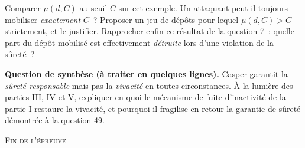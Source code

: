 \documentclass[11pt,a4paper]{article}
\begin{document}
\Q Comparer $\mu(d,C)$ au seuil $C$ sur cet exemple. Un attaquant peut-il toujours
mobiliser \emph{exactement} $C$~? Proposer un jeu de dépôts pour lequel $\mu(d,C)>C$
strictement, et le justifier. Rapprocher enfin ce résultat de la question 7~: quelle part du
dépôt mobilisé est effectivement \emph{détruite} lors d'une violation de la sûreté~?

\Q \textbf{Question de synthèse (à traiter en quelques lignes).} Casper garantit la
\emph{sûreté responsable} mais pas la \emph{vivacité} en toutes circonstances. À la lumière
des parties III, IV et V, expliquer en quoi le mécanisme de fuite d'inactivité de la partie I
restaure la vivacité, et pourquoi il fragilise en retour la garantie de sûreté démontrée à
la question 49.

\vfill
\begin{center}\small\textsc{Fin de l'épreuve}\end{center}
\end{document}
